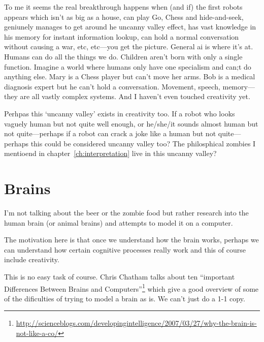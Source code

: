 To me it seems the real breakthrough happens when (and if) the first robots appears which isn't as big as a house, can play Go, Chess and hide-and-seek, geniunely manages to get around he uncanny valley effect, has vast knowledge in his memory for instant information lookup, can hold a normal conversation without causing a war, etc, etc---you get the picture. General \gls{ai} is where it's at. Humans can do all the things we do. Children aren't born with only a single function. Imagine a world where humans only have one specialism and can;t do anything else. Mary is a Chess player but can't move her arms. Bob is a medical diagnosis expert but he can't hold a conversation. Movement, speech, memory---they are all vastly complex systems. And I haven't even touched creativity yet.

Perhpas this `uncanny valley' exists in creativity too. If a robot who looks vaguely human but not quite well enough, or he/she/it sounds almost human but not quite---perhaps if a robot can crack a joke like a human but not quite---perhaps this could be considered uncanny valley too? The philosphical zombies I mentioend in chapter~\ref{ch:interpretation} live in this uncanny valley?


\section{Brains}
I'm not talking about the beer or the zombie food but rather research into the human brain (or animal brains) and attempts to model it on a computer. 

The motivation here is that once we understand how the brain works, perhaps we can understand how certain cognitive processes really work and this of course include creativity.

This is no easy task of course. Chris Chatham talks about ten ``important Differences Between Brains and Computers''\footnote{\url{http://scienceblogs.com/developingintelligence/2007/03/27/why-the-brain-is-not-like-a-co/}} which give a good overview of some of the dificulties of trying to model a brain as is. We can't just do a 1-1 copy.

